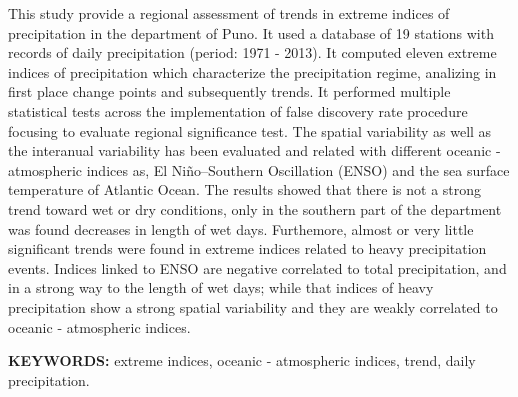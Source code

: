 This study provide a regional assessment of trends in extreme indices of precipitation in the department of Puno. It used a database of 19 stations with records of daily precipitation (period: 1971 - 2013). It computed eleven extreme indices of precipitation which characterize the precipitation regime, analizing in first place change points and subsequently trends. It performed multiple statistical tests across the implementation of false discovery rate procedure focusing to evaluate regional significance test. The spatial variability as well as the interanual variability has been evaluated and related with different oceanic - atmospheric indices as, El Niño–Southern Oscillation (ENSO) and the sea surface temperature of Atlantic Ocean. The results showed that there is not a strong trend toward wet or dry conditions, only in the southern part of the department was found decreases in length of wet days. Furthemore, almost or very little significant trends were found in extreme indices related to heavy precipitation events. Indices linked to ENSO are negative correlated to total precipitation, and in a strong way to the length of wet days; while that indices of heavy precipitation show a strong spatial variability and they are weakly correlated to oceanic - atmospheric indices.

\vspace*{3cm}

\textbf {KEYWORDS:} extreme indices, oceanic - atmospheric indices, trend, daily precipitation.